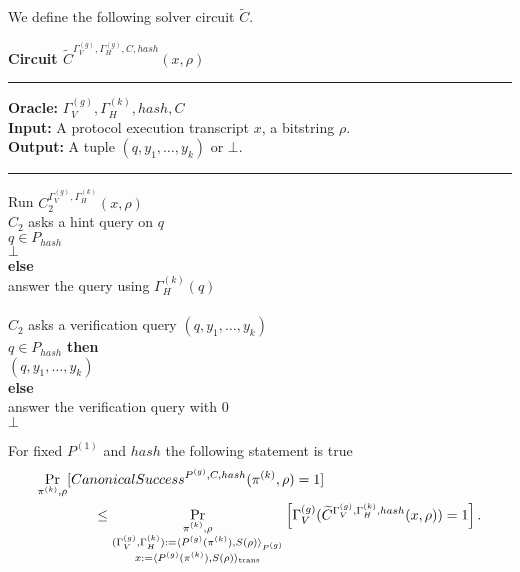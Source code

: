 %
We define the following solver circuit $\widetilde{C}$.
\begin{codeblock}
  \textbf{Circuit $\widetilde{C}^{\Gamma_V^{(g)}, \Gamma_H^{(g)}, C, hash} (x, \rho)$}
  \medskip \hrule \medskip
  \textbf{Oracle:} $\Gamma_V^{(g)}, \Gamma_H^{(k)}, hash, C$ \\
  \textbf{Input:} A protocol execution transcript $x$, a bitstring $\rho$. \\
  \textbf{Output:} A tuple $(q, y_1, \dots, y_k)$ or $\bot$.
  \medskip\hrule\medskip
  Run $C_2^{\Gamma_V^{(g)},\Gamma_H^{(k)}}(x, \rho)$ \\
  \IndI \If $C_2$ asks a hint query on $q$ \then\\
  \IndII \If $q \in P_{hash}$ \then\\
  \IndIII \return $\bot$\\
  \IndII \textbf{else}\\
  \IndIII answer the query using $\Gamma_H^{(k)}(q)$\\
  \\
  \IndI \If $C_2$ asks a verification query $(q, y_1, \dots, y_k)$ \then \\
  \IndII \If $q \in P_{hash}$ \textbf{then} \\
  \IndIII \return $(q, y_1, \dots, y_k)$ \\
  \IndII \textbf{else} \\
  \IndIII answer the verification query with 0 \\
  \return $\bot$
\end{codeblock}
%
\begin{lemma}
  For fixed $P^{(1)}$ and $hash$ the following statement is true
  \begin{align*}
    &\underset{\pi^{(k)}, \rho}{\Pr}[CanonicalSuccess^{P^{(g)}, C, hash}(\pi^{(k)}, \rho) = 1] \\
    &\mbox\qquad\qquad \leq \underset{\substack{ \pi^{(k)}, \rho \\
        (\Gamma_V^{(g)}, \Gamma_H^{(k)}) := \langle P^{(g)}(\pi^{(k)}), S(\rho) \rangle_{P^{(g)}} \\
        x:= \langle P^{(g)}(\pi^{(k)}), S(\rho) \rangle_{\text{trans}}}}
  {\Pr}\left[\Gamma_V^{(g)} (\widetilde{C}^{\Gamma_V^{(g)}, \Gamma_H^{(k)}, hash}(x, \rho)) = 1\right].
  \end{align*}
\end{lemma}
%
